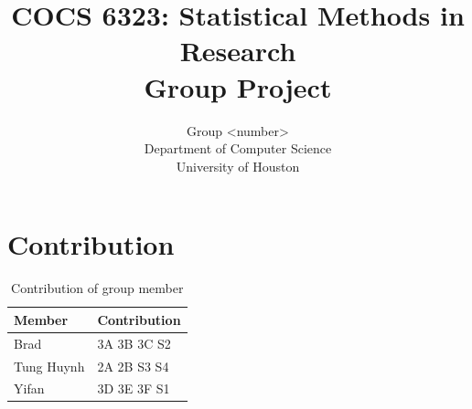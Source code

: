 \documentclass[10pt]{article}         %
\title{COCS 6323: Statistical Methods in Research \\ Group Project} %
\author{Group <number> \\
        Department of Computer Science\\
        University of Houston}         %
\begin{document}



\maketitle              %

\newpage
\tableofcontents        %
\listoftables           %
\listoffigures          %

\newpage
\section{Contribution}
\begin{table}[h]
\begin{tabular}{|l|l|}
\hline
\textbf{Member} & \textbf{Contribution} \\ \hline
Brad & 3A 3B 3C S2\\ \hline
Tung Huynh & 2A 2B S3 S4\\ \hline
Yifan & 3D 3E 3F S1\\ \hline
\end{tabular}
\caption{Contribution of group member}
\label{tbl:contribution}
\end{table}

\newpage
\end{document}

